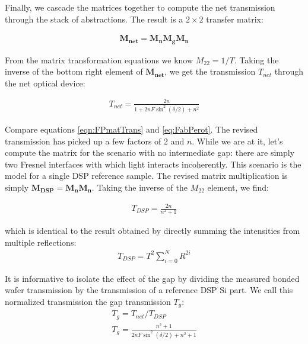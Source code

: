 Finally, we cascade the matrices together to compute the net transmission through the stack of abstractions.  The result is a $2\times2$ transfer matrix:

\begin{eqnarray}
\boldsymbol{M_{net}}=\boldsymbol{M_n}\boldsymbol{M_g}\boldsymbol{M_n}
\end{eqnarray}

From the matrix transformation equations \cite{2007fuph.book.....S} we know $M_{22}=1/T$.  Taking the inverse of the bottom right element of $\boldsymbol{M_{net}}$, we get the transmission $T_{net}$ through the net optical device:

\begin{eqnarray}
T_{net}=\frac{2 n}{1+ 2n F\sin ^2(\delta/2)+n^2} \label{eqn:FPmatTrans}
\end{eqnarray}

Compare equations \ref{eqn:FPmatTrans} and \ref{eq:FabPerot}.  The revised transmission has picked up a few factors of 2 and $n$.  While we are at it, let's compute the matrix for the scenario with no intermediate gap: there are simply two Fresnel interfaces with which light interacts incoherently.  This scenario is the model for a single DSP reference sample. The revised matrix multiplication is simply $\boldsymbol{M_{DSP}}=\boldsymbol{M_n}\boldsymbol{M_n}$.  Taking the inverse of the $M_{22}$ element, we find:

\begin{eqnarray}
T_{DSP}=\frac{2 n}{n^2+1}\label{eqn:EqofSummedSlab}
\end{eqnarray}

which is identical to the result obtained by directly summing the intensities from multiple reflections:
\begin{eqnarray}
T_{DSP}=T^2 \sum_{i=0}^{N}R^{2i} \label{eqn:multsum}
\end{eqnarray}

It is informative to isolate the effect of the gap by dividing the measured bonded wafer transmission by the transmission of a reference DSP Si part.  We call this normalized transmission the gap transmission $T_{g}$:
\begin{eqnarray}
T_{g} = T_{net}/T_{DSP} \\
T_{g} = \frac{n^2+1}{2 n F \sin ^2(\delta/2)+n^2+1} \label{eqn:Tetalon}
\end{eqnarray}
